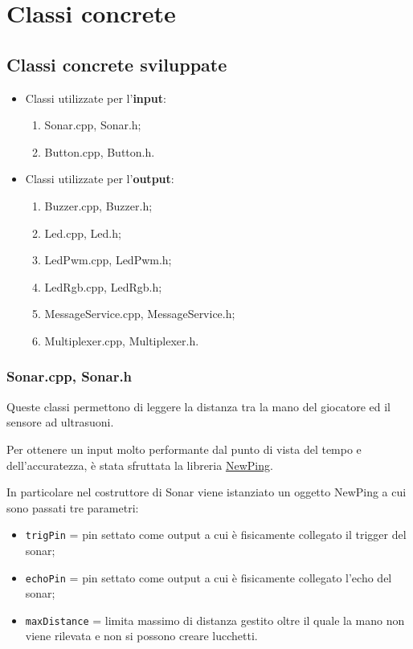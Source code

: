 \chapter{Classi concrete}
\section{Classi concrete sviluppate}
\begin{itemize}
	\item Classi utilizzate per l'\textbf{input}:
	\begin{enumerate}
		\item Sonar.cpp, Sonar.h;
		\item Button.cpp, Button.h.
	\end{enumerate}
	\item Classi utilizzate per l'\textbf{output}:
	\begin{enumerate}
		\item Buzzer.cpp, Buzzer.h;
		\item Led.cpp, Led.h;
		\item LedPwm.cpp, LedPwm.h;
		\item LedRgb.cpp, LedRgb.h;
		\item MessageService.cpp, MessageService.h;
		\item Multiplexer.cpp, Multiplexer.h.
	\end{enumerate}
\end{itemize}

\subsection{Sonar.cpp, Sonar.h}
Queste classi permettono di leggere la distanza tra la mano del giocatore ed il sensore ad ultrasuoni.

Per ottenere un input molto performante dal punto di vista del tempo e dell'accuratezza, è stata sfruttata la libreria \href{http://playground.arduino.cc/Code/NewPing}{NewPing}.

In particolare nel costruttore di Sonar viene istanziato un oggetto NewPing a cui sono passati tre parametri:
\begin{itemize}
	\item \texttt{trigPin} = pin settato come output a cui è fisicamente collegato il trigger del sonar;
	\item \texttt{echoPin} = pin settato come output a cui è fisicamente collegato l'echo del sonar;
	\item \texttt{maxDistance} = limita massimo di distanza gestito oltre il quale la mano non viene rilevata e non si possono creare lucchetti.
\end{itemize}

